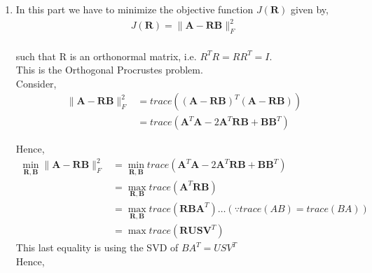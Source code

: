 \documentclass[12pt]{article}
\begin{document}
\begin{enumerate}
    \item In this part we have to minimize the objective function $J(\boldsymbol{R})$ given by,
    \begin{gather*}
        J(\boldsymbol{R}) = \|\boldsymbol{A}-\boldsymbol{R} \boldsymbol{B}\|^2_F
    \end{gather*} \\
    such that R is an orthonormal matrix, i.e. $R^T R = R R^T = I$.\\
    This is the Orthogonal Procrustes problem. \\
    Consider,
    \begin{equation*}
    \begin{split}
        \|\boldsymbol{A}-\boldsymbol{R} \boldsymbol{B}\|^2_F & = trace((\boldsymbol{A} - \boldsymbol{R} \boldsymbol{B})^T (\boldsymbol{A} - \boldsymbol{R} \boldsymbol{B})) \\
        & = trace(\boldsymbol{A}^T \boldsymbol{A} - 2 \boldsymbol{A}^T \boldsymbol{R} \boldsymbol{B} + \boldsymbol{B} \boldsymbol{B}^T )
    \end{split}
    \end{equation*}

    Hence,
    \begin{equation*}
        \begin{split}
             \min_{\boldsymbol{R} , \boldsymbol{B}} \|\boldsymbol{A}-\boldsymbol{R} \boldsymbol{B}\|^2_F & = 
             \min_{\boldsymbol{R} , \boldsymbol{B}} trace(\boldsymbol{A}^T \boldsymbol{A} - 2 \boldsymbol{A}^T \boldsymbol{R} \boldsymbol{B} + \boldsymbol{B} \boldsymbol{B}^T ) \\
             & = \max_{\boldsymbol{R} , \boldsymbol{B}} trace(\boldsymbol{A}^T \boldsymbol{R} \boldsymbol{B}) \\
             & = \max_{\boldsymbol{R} , \boldsymbol{B}} trace(\boldsymbol{R}\boldsymbol{B}\boldsymbol{A}^T) \dots (\because trace(AB) = trace(BA)) \\
             & = \max trace(\boldsymbol{R} \boldsymbol{U} \boldsymbol{S} \boldsymbol{V}^T)
        \end{split}
        \end{equation*}
        This last equality is using the SVD of $BA^T = USV^T$\\
        Hence, 


\end{enumerate}
\end{document}
